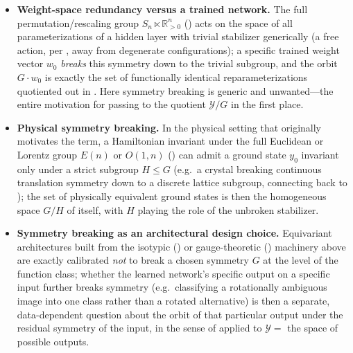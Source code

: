 \documentclass[mathematics,review,submit,moreauthors]{Definitions/mdpi}
\begin{document}
\begin{Example}\label{ex:symmetry-breaking}
\phantom{u}
\begin{itemize}
    \item \textbf{Weight-space redundancy versus a trained network.} The
    full permutation/rescaling group $S_n \ltimes \mathbb{R}_{>0}^n$
    () acts on the space of all
    parameterizations of a hidden layer with trivial stabilizer generically
    (a free action, per , away from
    degenerate configurations); a specific trained weight vector $w_0$
    \emph{breaks} this symmetry down to the trivial subgroup, and the orbit
    $G \cdot w_0$ is exactly the set of functionally identical
    reparameterizations quotiented out in
    . Here symmetry breaking is
    generic and unwanted---the entire motivation for passing to the
    quotient $\mathcal{Y}/G$ in the first place.
    \item \textbf{Physical symmetry breaking.} In the physical setting that
    originally motivates the term, a Hamiltonian invariant under the full
    Euclidean or Lorentz group $E(n)$ or $O(1,n)$
    () can admit a ground state $y_0$ invariant
    only under a strict subgroup $H \leq G$ (e.g.\ a crystal breaking
    continuous translation symmetry down to a discrete lattice subgroup,
    connecting back to ); the set of
    physically equivalent ground states is then the homogeneous space
    $G/H$ of  itself, with $H$ playing the
    role of the unbroken stabilizer.
    \item \textbf{Symmetry breaking as an architectural design choice.}
    Equivariant architectures built from the isotypic
    () or gauge-theoretic
    () machinery above are exactly
    calibrated \emph{not} to break a chosen symmetry $G$ at the level of the
    function class; whether the learned network's specific output on a
    specific input further breaks symmetry (e.g.\ classifying a
    rotationally ambiguous image into one class rather than a rotated
    alternative) is then a separate, data-dependent question about the
    orbit of that particular output under the residual symmetry of the
    input, in the sense of  applied
    to $\mathcal{Y} = $ the space of possible outputs.
\end{itemize}
\end{Example}
\end{document}
